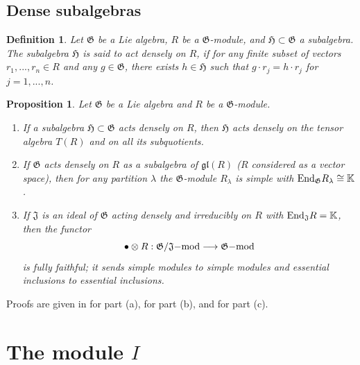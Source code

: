 \documentclass[12pt]{article}
\def\KK {{\mathbb K}}     %
\def\lw  {\longrightarrow}
\def\mk {\mathfrak}
\newtheorem{prop}[theorem]{Proposition}
\newtheorem{definition}{Definition}[section]
\begin{document}
\subsection{Dense subalgebras}


\begin{definition}\label{Def Dense}
Let $\mk G$ be a Lie algebra, $R$ be a $\mk G$-module, and $\mk H\subset\mk G$ a subalgebra. The subalgebra $\mk H$ is said to act {\rm densely} on $R$, if for any finite subset of vectors $r_1,...,r_n\in R$ and any $g\in\mk G$, there exists $h\in\mk H$ such that $g\cdot r_j=h\cdot r_j$ for  $j=1,...,n$.
\end{definition}

\begin{prop}\label{Prop DenseProperties}
Let $\mk G$ be a Lie algebra and $R$ be a $\mk G$-module.
\begin{enumerate}
\item[{\rm (a)}] If a subalgebra $\mk H\subset \mk G$ acts densely on $R$, then $\mk H$ acts densely on the tensor algebra $T(R)$ and on all its subquotients.
\item[{\rm (b)}] If $\mk G$ acts densely on $R$ as a subalgebra of $\mk{gl}(R)$ ($R$ considered as a vector space), then for any partition $\lambda$ the $\mk G$-module $R_\lambda$ is simple with ${\rm End}_{\mk G}R_\lambda\cong \KK$.
\item[{\rm (c)}] If $\mk J$ is an ideal of $\mk G$ acting densely and irreducibly on $R$ with ${\rm End}_{\mk J}R=\KK$, then the functor
$$
\bullet\otimes R : \mk G/\mk J{\rm -mod} \lw \mk G{\rm -mod}
$$
is fully faithful; it sends simple modules to simple modules and essential inclusions to essential inclusions.
\end{enumerate}
\end{prop}

Proofs are given in \cite[Lemma 7.3]{Penkov-Serganova-Mackey} for part (a), \cite[Proposition~4.5]{Chirvasitu-Penkov-RC} for part (b), \cite[Lemma~4.4]{Chirvasitu-Penkov-RC} and \cite[Lemma~3.3]{Chirvasitu-Penkov-UTC} for part (c).



\section{The module $I$}\label{Sec Module I}
\end{document}
